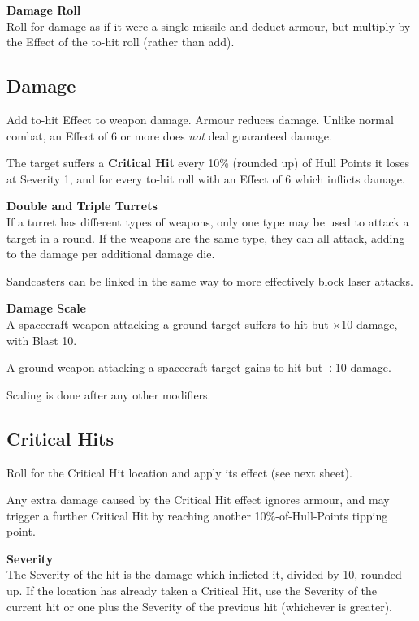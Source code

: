 \documentclass{cheatsheet}
\begin{document}
\begin{multicols}{3}
\textbf{Damage Roll}\\
Roll for damage as if it were a single missile and deduct armour, but
multiply by the Effect of the to-hit roll (rather than add).

\subsection{Damage}

Add to-hit Effect to weapon damage.  Armour reduces damage.  Unlike
normal combat, an Effect of 6 or more does \emph{not} deal guaranteed
damage.

The target suffers a \textbf{Critical Hit} every 10\% (rounded up) of
Hull Points it loses at Severity 1, and for every to-hit roll with an
Effect of 6 which inflicts damage.

\textbf{Double and Triple Turrets}\\
If a turret has different types of weapons, only one type may be used
to attack a target in a round.  If the weapons are the same type, they
can all attack, adding  to the damage per additional damage
die.

Sandcasters can be linked in the same way to more effectively block
laser attacks.

\textbf{Damage Scale}\\
A spacecraft weapon attacking a ground target suffers 
to-hit but $\times$10 damage, with Blast 10.

A ground weapon attacking a spacecraft target gains  to-hit
but $\div$10 damage.

Scaling is done after any other modifiers.

\subsection{Critical Hits}

Roll for the Critical Hit location and apply its effect (see next
sheet).

Any extra damage caused by the Critical Hit effect ignores armour, and
may trigger a further Critical Hit by reaching another
10\%-of-Hull-Points tipping point.

\textbf{Severity}\\
The Severity of the hit is the damage which inflicted it, divided by
10, rounded up.  If the location has already taken a Critical Hit, use
the Severity of the current hit or one plus the Severity of the
previous hit (whichever is greater).


\end{multicols}
\end{document}
